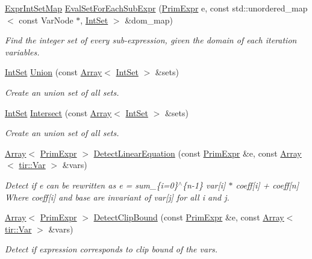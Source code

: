 \begin{DoxyCompactItemize}
\hyperlink{namespacetvm_1_1arith_a94daf21fa21c1f7dd83081248f26d9eb}{Expr\+Int\+Set\+Map} \hyperlink{namespacetvm_1_1arith_a8a112f07411c5e1237b0c045ff276ac6}{Eval\+Set\+For\+Each\+Sub\+Expr} (\hyperlink{classtvm_1_1PrimExpr}{Prim\+Expr} e, const std\+::unordered\+\_\+map$<$ const Var\+Node $\ast$, \hyperlink{classtvm_1_1arith_1_1IntSet}{Int\+Set} $>$ \&dom\+\_\+map)
\begin{DoxyCompactList}\small\item\em Find the integer set of every sub-\/expression, given the domain of each iteration variables. \end{DoxyCompactList}\item 
\hyperlink{classtvm_1_1arith_1_1IntSet}{Int\+Set} \hyperlink{namespacetvm_1_1arith_a68a0523bf0384e492ab222d30be9160e}{Union} (const \hyperlink{classtvm_1_1Array}{Array}$<$ \hyperlink{classtvm_1_1arith_1_1IntSet}{Int\+Set} $>$ \&sets)
\begin{DoxyCompactList}\small\item\em Create an union set of all sets. \end{DoxyCompactList}\item 
\hyperlink{classtvm_1_1arith_1_1IntSet}{Int\+Set} \hyperlink{namespacetvm_1_1arith_ad66a987ddb3d8aee69f9175bf412eb8a}{Intersect} (const \hyperlink{classtvm_1_1Array}{Array}$<$ \hyperlink{classtvm_1_1arith_1_1IntSet}{Int\+Set} $>$ \&sets)
\begin{DoxyCompactList}\small\item\em Create an union set of all sets. \end{DoxyCompactList}\item 
\hyperlink{classtvm_1_1Array}{Array}$<$ \hyperlink{classtvm_1_1PrimExpr}{Prim\+Expr} $>$ \hyperlink{namespacetvm_1_1arith_a87a12ee0854469b04329a961ef261559}{Detect\+Linear\+Equation} (const \hyperlink{classtvm_1_1PrimExpr}{Prim\+Expr} \&e, const \hyperlink{classtvm_1_1Array}{Array}$<$ \hyperlink{classtvm_1_1tir_1_1Var}{tir\+::\+Var} $>$ \&vars)
\begin{DoxyCompactList}\small\item\em Detect if e can be rewritten as e = sum\+\_\+\{i=0\}$^\wedge$\{n-\/1\} var\mbox{[}i\mbox{]} $\ast$ coeff\mbox{[}i\mbox{]} + coeff\mbox{[}n\mbox{]} Where coeff\mbox{[}i\mbox{]} and base are invariant of var\mbox{[}j\mbox{]} for all i and j. \end{DoxyCompactList}\item 
\hyperlink{classtvm_1_1Array}{Array}$<$ \hyperlink{classtvm_1_1PrimExpr}{Prim\+Expr} $>$ \hyperlink{namespacetvm_1_1arith_a739616342876c2633b87ed16c649bc91}{Detect\+Clip\+Bound} (const \hyperlink{classtvm_1_1PrimExpr}{Prim\+Expr} \&e, const \hyperlink{classtvm_1_1Array}{Array}$<$ \hyperlink{classtvm_1_1tir_1_1Var}{tir\+::\+Var} $>$ \&vars)
\begin{DoxyCompactList}\small\item\em Detect if expression corresponds to clip bound of the vars. \end{DoxyCompactList}\end{DoxyCompactItemize}


